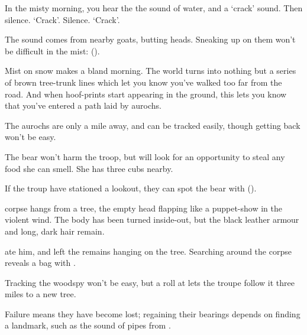 
\ifcase\value{cycle}

\begin{boxtext}
  In the misty morning, you hear the the sound of water, and a `crack' sound.
  Then silence.
  `Crack'.
  Silence.
  `Crack'.
\end{boxtext}

The sound comes from nearby goats, butting heads.
Sneaking up on them won't be difficult in the mist:  (\tn[9]).

\or

\begin{boxtext}
  Mist on snow makes a bland morning.
  The world turns into nothing but a series of brown tree-trunk lines which let you know you've walked too far from the road.
  And when hoof-prints start appearing in the ground, this lets you know that you've entered a path laid by aurochs.
\end{boxtext}

The aurochs are only a mile away, and can be tracked easily, though getting back won't be easy.


\or

The bear won't harm the troop, but will look for an opportunity to steal any food she can smell.
She has three cubs nearby.

\setcounter{tn}{\value{Dexterity}}
\addtocounter{tn}{\value{Stealth}}

If the troup have stationed a lookout, they can spot the bear with  (\tn).

\bear

\else

\begin{boxtext}
   corpse hangs from a tree, the empty head flapping like a puppet-show in the violent wind.
  The body has been turned inside-out, but the black leather armour and long, dark hair remain.
\end{boxtext}

 ate him, and left the remains hanging on the tree.
Searching around the corpse reveals a bag with \lootSmall.

Tracking the \gls{woodspy} won't  be easy, but a  roll at \tn[10] lets the troupe follow it three miles to a new tree.

\woodspy

Failure means they have become lost; regaining their bearings depends on finding a landmark, such as the sound of pipes from .

\fi
